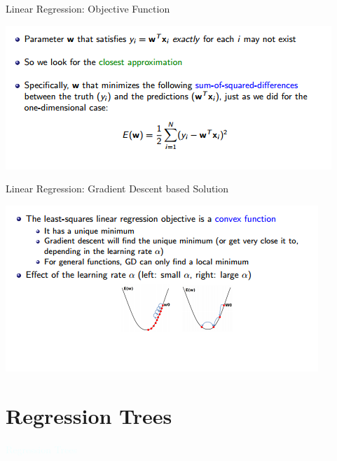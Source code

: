 \documentclass{beamer}
\newcommand{\thblue}[1]{{\Huge {\textcolor{azure}{#1}}}}
\begin{document}
\begin{frame}{Linear Regression: Objective Function }
    \begin{center}
        \includegraphics[scale=0.6]{linearRegrObjFn.png}
    \end{center}
\end{frame}
\begin{frame}{Linear Regression: Gradient Descent based Solution}
    \begin{center}
        \includegraphics[scale=0.7]{gradientDescent.png}
    \end{center}
\end{frame}

\section{Regression Trees}
\begin{frame}{} 
    \begin{center}
        \thblue{Regression Trees}
    \end{center}
\end{frame}
\end{document}
